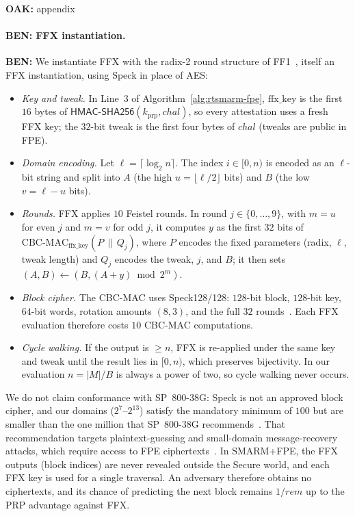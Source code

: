 \documentclass{ieeeaccess}
\DeclareRobustCommand{\oak}[1]{{\color{OAKcolor}\textbf{OAK:} #1}}
\DeclareRobustCommand{\ben}[1]{{\color{BENcolor}\textbf{BEN:} #1}}
\newcommand{\rtsmarmtwo}{SMARM+FPE\xspace}
\begin{document}
\oak{appendix}
\paragraph{\ben{FFX instantiation.}}
\ben{We instantiate FFX with the radix-2 round structure of FF1~\cite{ff1}, itself an FFX instantiation, using Speck in place of AES:
\begin{itemize}
  \item \emph{Key and tweak.} In Line~3 of Algorithm~\ref{alg:rtsmarm-fpe}, $\text{ffx\_key}$ is the first $16$ bytes of $\mathsf{HMAC\text{-}SHA256}(k_{\mathrm{prp}}, chal)$, so every attestation uses a fresh FFX key; the $32$-bit tweak is the first four bytes of $chal$ (tweaks are public in FPE).
  \item \emph{Domain encoding.} Let $\ell = \lceil \log_2 n \rceil$. The index $i \in [0, n)$ is encoded as an $\ell$-bit string and split into $A$ (the high $u = \lfloor \ell/2 \rfloor$ bits) and $B$ (the low $v = \ell - u$ bits).
  \item \emph{Rounds.} FFX applies $10$ Feistel rounds. In round $j \in \{0,\dots,9\}$, with $m = u$ for even $j$ and $m = v$ for odd $j$, it computes $y$ as the first $32$ bits of $\mathrm{CBC\text{-}MAC}_{\text{ffx\_key}}(P \,\|\, Q_j)$, where $P$ encodes the fixed parameters (radix, $\ell$, tweak length) and $Q_j$ encodes the tweak, $j$, and $B$; it then sets $(A, B) \gets (B, (A + y) \bmod 2^m)$.
  \item \emph{Block cipher.} The CBC-MAC uses Speck128/128: $128$-bit block, $128$-bit key, $64$-bit words, rotation amounts $(8, 3)$, and the full $32$ rounds~\cite{speck}. Each FFX evaluation therefore costs $10$ CBC-MAC computations.
  \item \emph{Cycle walking.} If the output is $\ge n$, FFX is re-applied under the same key and tweak until the result lies in $[0, n)$, which preserves bijectivity. In our evaluation $n = |M|/B$ is always a power of two, so cycle walking never occurs.
\end{itemize}
We do not claim conformance with SP~800-38G: Speck is not an approved block cipher, and our domains ($2^{7}$--$2^{13}$) satisfy the mandatory minimum of $100$ but are smaller than the one million that SP~800-38G recommends~\cite{ff1}.
That recommendation targets plaintext-guessing and small-domain message-recovery attacks, which require access to FPE ciphertexts~\cite{hoang2018curse}.
In \rtsmarmtwo, the FFX outputs (block indices) are never revealed outside the Secure world, and each FFX key is used for a single traversal. An adversary therefore obtains no ciphertexts, and its chance of predicting the next block remains $1/rem$ up to the PRP advantage against FFX.}
\end{document}
